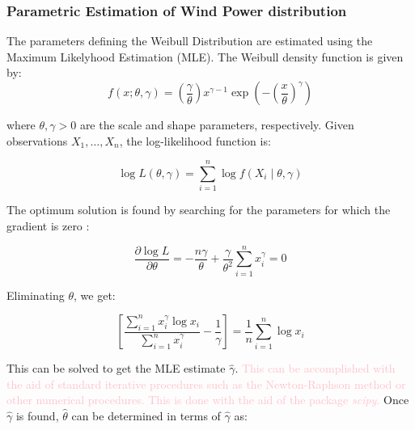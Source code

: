 
\subsubsection{Parametric Estimation of Wind Power distribution}\label{subsection: weib estim}

The parameters defining the Weibull Distribution are estimated using the Maximum Likelyhood Estimation (MLE). The Weibull density function is given by:
\[
f(x; \theta, \gamma) = \left(\frac{\gamma}{\theta}\right)x^{\gamma-1}\exp\left(-\left(\frac{x}{\theta}\right)^\gamma\right)
\]

where \(\theta, \gamma > 0\) are the scale and shape parameters, respectively. Given observations \(X_1, \ldots, X_n\), the log-likelihood function is:

\[
\log L(\theta, \gamma) = \sum_{i=1}^n \log f(X_i \mid \theta, \gamma)
\]

The optimum solution is found by searching for the parameters for which the gradient is zero :

\begin{equation}
\frac{\partial \log L}{\partial \theta} = -\frac{n \gamma}{\theta} + \frac{\gamma}{\theta^2} \sum_{i=1}^{n} x_i^\gamma = 0
\end{equation}

Eliminating $\theta$, we get:

\begin{equation}
\left[ \frac{\sum_{i=1}^{n} x_i^\gamma \log x_i}{\sum_{i=1}^{n} x_i^\gamma} - \frac{1}{\gamma} \right] = \frac{1}{n} \sum_{i=1}^{n} \log x_i
\end{equation}

This can be solved to get the MLE estimate $\hat{\gamma}$. \textcolor{pink}{This can be accomplished with the aid of standard iterative procedures such as the Newton-Raphson method or other numerical procedures. This is done with the aid of the package \emph{scipy}.} Once $\hat{\gamma}$ is found, $\hat{\theta}$ can be determined in terms of $\hat{\gamma}$ as:

